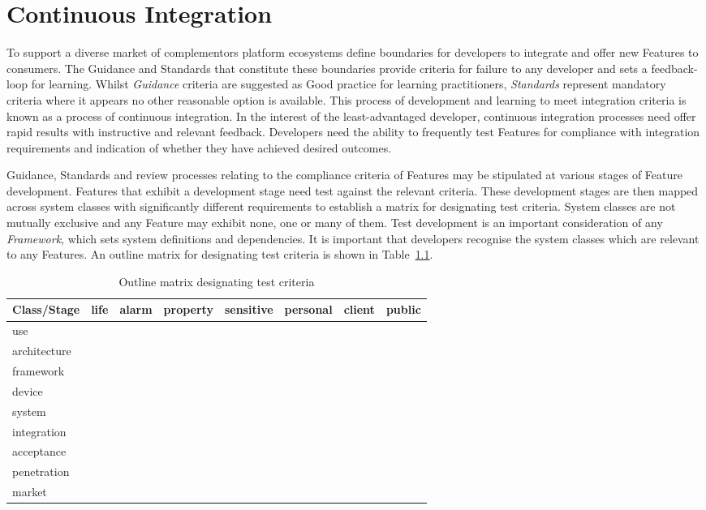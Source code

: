 \documentclass[11pt, oneside]{book}   	%
\begin{document}
\pagebreak

\chapter{Continuous Integration}
To support a diverse market of complementors platform ecosystems define boundaries for developers to integrate and offer new Features to consumers.
The Guidance and Standards that constitute these boundaries provide criteria for failure to any developer and sets a feedback-loop for learning.
Whilst \emph{Guidance} criteria are suggested as Good practice for learning practitioners, \emph{Standards} represent mandatory criteria where it appears no other reasonable option is available.
This process of development and learning to meet integration criteria is known as a process of continuous integration.
In the interest of the least-advantaged developer, continuous integration processes need offer rapid results with instructive and relevant feedback.
Developers need the ability to frequently test Features for compliance with integration requirements and indication of whether they have achieved desired outcomes.\

Guidance, Standards and review processes relating to the compliance criteria of Features may be stipulated at various stages of Feature development.
Features that exhibit a development stage need test against the relevant criteria.
These development stages are then mapped across system classes with significantly different requirements to establish a matrix for designating test criteria.
System classes are not mutually exclusive and any Feature may exhibit none, one or many of them.
Test development is an important consideration of any \emph{Framework}, which sets system definitions and dependencies.
It is important that developers recognise the system classes which are relevant to any Features.
An outline matrix for designating test criteria is shown in Table~\ref{Test matrix}.

\pagebreak

\FloatBarrier
\begin{table}
	\caption{Outline matrix designating test criteria}
	\begin{center}
		\begin{tabular}{| l | c | c | c | c | c | c | c |}
		\hline
		Class/Stage&life&alarm&property&sensitive&personal&client&public\\
		\hline
		use&&&&&&&\\
		architecture&&&&&&&\\
		framework&&&&&&&\\
		device&&&&&&&\\
		system&&&&&&&\\
		integration&&&&&&&\\
		acceptance&&&&&&&\\
		penetration&&&&&&&\\
		market&&&&&&&\\
		\hline
		\end{tabular}
	\end{center}
	\label{Test matrix}
\end{table}
\FloatBarrier
\end{document}
